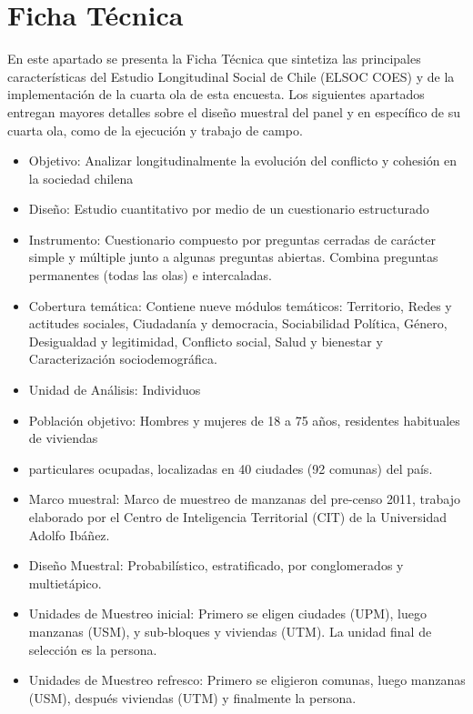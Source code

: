 \documentclass[
]{book}
\providecommand{\tightlist}{%
  \setlength{\itemsep}{0pt}\setlength{\parskip}{0pt}}
\begin{document}
\hypertarget{ficha-tecnica}{%
\section{Ficha Técnica}\label{ficha-tecnica}}

En este apartado se presenta la Ficha Técnica que sintetiza las principales características del Estudio Longitudinal Social de Chile (ELSOC COES) y de la implementación de la cuarta ola de esta encuesta. Los siguientes apartados entregan mayores detalles sobre el diseño muestral del panel y en específico de su cuarta ola, como de la ejecución y trabajo de campo.

\begin{itemize}
\tightlist
\item
  Objetivo: Analizar longitudinalmente la evolución del conflicto y cohesión en la sociedad chilena
\item
  Diseño: Estudio cuantitativo por medio de un cuestionario estructurado
\item
  Instrumento: Cuestionario compuesto por preguntas cerradas de carácter simple y múltiple junto a algunas preguntas abiertas. Combina preguntas permanentes (todas las olas) e intercaladas.
\item
  Cobertura temática: Contiene nueve módulos temáticos: Territorio, Redes y actitudes sociales, Ciudadanía y democracia, Sociabilidad Política, Género, Desigualdad y legitimidad, Conflicto social, Salud y bienestar y Caracterización sociodemográfica.
\item
  Unidad de Análisis: Individuos
\item
  Población objetivo: Hombres y mujeres de 18 a 75 años, residentes habituales de viviendas
\item
  particulares ocupadas, localizadas en 40 ciudades (92 comunas) del país.
\item
  Marco muestral: Marco de muestreo de manzanas del pre-censo 2011, trabajo elaborado por el Centro de Inteligencia Territorial (CIT) de la Universidad Adolfo Ibáñez.
\item
  Diseño Muestral: Probabilístico, estratificado, por conglomerados y multietápico.
\item
  Unidades de Muestreo inicial: Primero se eligen ciudades (UPM), luego manzanas (USM), y sub-bloques y viviendas (UTM). La unidad final de selección es la persona.
\item
  Unidades de Muestreo refresco: Primero se eligieron comunas, luego manzanas (USM), después viviendas (UTM) y finalmente la persona.

\end{itemize}
\end{document}

